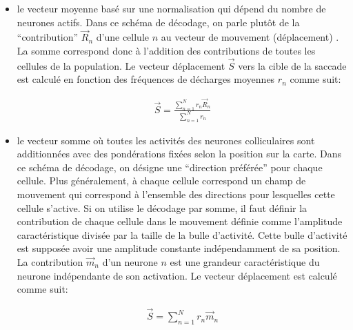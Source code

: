 \begin{itemize}

\item le vecteur moyenne \cite {Lee:1988} basé sur une normalisation qui dépend du nombre de neurones actifs. Dans ce schéma de décodage, on parle plutôt de la ``contribution'' $\vec{R}_n$ d'une cellule $n$ au vecteur de mouvement (déplacement) \cite{Walton:2005, Lee:1988}. La somme correspond donc à l'addition des contributions de toutes les cellules de la population. Le vecteur déplacement $\vec{S}$ vers la cible de la saccade est calculé en fonction des fréquences de décharges moyennes $r_n$ comme suit:

\begin{align}
  \vec{S} = \frac{\sum_{n=1}^{N} r_n\vec{R}_n }{\sum_{n=1}^{N} r_n}
\label{moy}
\end{align} 

\item le vecteur somme \cite{McIlwain:1976, Sparks:1976} où toutes les activités des neurones colliculaires sont additionnées avec des pondérations fixées selon la position sur la carte. Dans ce schéma de décodage, on désigne une ``direction préférée'' pour chaque cellule. Plus généralement, à chaque cellule correspond un champ de mouvement qui correspond à l'ensemble des directions pour lesquelles cette cellule s'active. Si on utilise le décodage par somme, il faut définir la contribution de chaque cellule dans le mouvement définie comme l'amplitude caractéristique divisée par la taille de la bulle d'activité. Cette bulle d'activité est supposée avoir une amplitude constante indépendamment de sa position. La contribution $\vec{m}_n$ d'un neurone $n$ est une grandeur caractéristique du neurone indépendante de son activation. Le vecteur déplacement est calculé comme suit: 

\begin{align}
  \vec{S} = \sum_{n=1}^{N} r_n\vec{m}_n 
\label{moy}
\end{align} 

\end {itemize}

